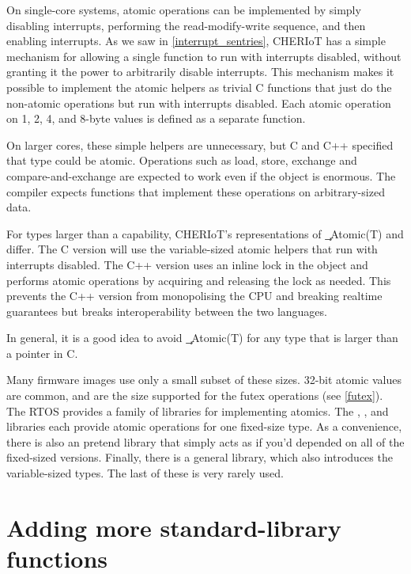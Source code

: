On single-core systems, atomic operations can be implemented by simply disabling interrupts, performing the read-modify-write sequence, and then enabling interrupts.
As we saw in \ref{interrupt_sentries}, CHERIoT has a simple mechanism for allowing a single function to run with interrupts disabled, without granting it the power to arbitrarily disable interrupts.
This mechanism makes it possible to implement the atomic helpers as trivial C functions that just do the non-atomic operations but run with interrupts disabled.
Each atomic operation on 1, 2, 4, and 8-byte values is defined as a separate function.

On larger cores, these simple helpers are unnecessary, but C and C++ specified that  type could be atomic.
Operations such as load, store, exchange and compare-and-exchange are expected to work even if the object is enormous.
The compiler expects functions that implement these operations on arbitrary-sized data.

\begin{caution}
For types larger than a capability, CHERIoT's representations of \c{_Atomic(T)} and  differ.
The C version will use the variable-sized atomic helpers that run with interrupts disabled.
The C++ version uses an inline lock in the object and performs atomic operations by acquiring and releasing the lock as needed.
This prevents the C++ version from monopolising the CPU and breaking realtime guarantees but breaks interoperability between the two languages.

In general, it is a good idea to avoid \c{_Atomic(T)} for any type that is larger than a pointer in C.
\end{caution}

Many firmware images use only a small subset of these sizes.
32-bit atomic values are common, and are the size supported for the futex operations (see \ref{futex}).
The RTOS provides a family of libraries for implementing atomics.
The , ,  and  libraries each provide atomic operations for one fixed-size type.
As a convenience, there is also an  pretend library that simply acts as if you'd depended on all of the fixed-sized versions.
Finally, there is a general  library, which also introduces the variable-sized types.
The last of these is very rarely used.

\section{Adding more standard-library functions}

